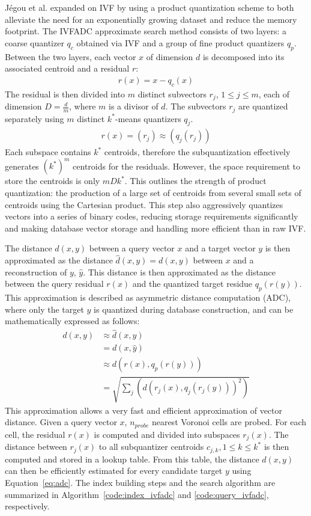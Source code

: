 \documentclass[twoside,a4paper]{master}
\begin{document}
Jégou et al. expanded on IVF by using a product quantization scheme to both alleviate the need for an exponentially growing dataset and reduce the memory footprint. The IVFADC approximate search method consists of two layers: a coarse quantizer \(q_c\) obtained via IVF and a group of fine product quantizers \(q_p\). Between the two layers, each vector \(x\) of dimension \(d\) is decomposed into its associated centroid and a residual \(r\):
\begin{align}
    r(x) = x - q_c(x)
\end{align}
The residual is then divided into \(m\) distinct subvectors \(r_j\), \(1 \leq j \leq m\), each of dimension \(D = \frac{d}{m}\), where \(m\) is a divisor of \(d\). The subvectors \(r_j\) are quantized separately using \(m\) distinct \(k^*\)-means quantizers \(q_j\).
\begin{align}
    r(x) = (r_j) \approx (q_j(r_j))
\end{align}
Each subspace contains \(k^*\) centroids, therefore the subquantization effectively generates \((k^*)^m\) centroids for the residuals. However, the space requirement to store the centroids is only \(mDk^*\). This outlines the strength of product quantization: the production of a large set of centroids from several small sets of centroids using the Cartesian product. This step also aggressively quantizes vectors into a series of binary codes, reducing storage requirements significantly and making database vector storage and handling more efficient than in raw IVF.

The distance \(d(x,y)\) between a query vector \(x\) and a target vector \(y\) is then approximated as the distance \(\hat{d}(x,y) = d(x,y)\) between \(x\) and a reconstruction of \(y\), \(\hat{y}\). This distance is then approximated as the distance between the query residual \(r(x)\) and the quantized target residue \(q_p(r(y))\). This approximation is described as asymmetric distance computation (ADC), where only the target \(y\) is quantized during database construction, and can be mathematically expressed as follows:
\begin{align}
    d(x,y) &\approx \hat{d}(x,y) \\
    &= d(x,\hat{y}) \\
    &\approx d(r(x),q_p(r(y))) \\
    &= \sqrt{\sum_j (d(r_j(x), q_j(r_j(y)))^2)}
\label{eq:adc}
\end{align}
This approximation allows a very fast and efficient approximation of vector distance. Given a query vector \(x\), \(n_{probe}\) nearest Voronoi cells are probed. For each cell, the residual \(r(x)\) is computed and divided into subspaces \(r_j(x)\). The distance between \(r_j(x)\) to all subquantizer centroids \(c_{j,k}, 1\leq k\leq k^*\) is then computed and stored in a lookup table. From this table, the distance \(d(x,y)\) can then be efficiently estimated for every candidate target \(y\) using Equation~\ref{eq:adc}. The index building steps and the search algorithm are summarized in Algorithm~\ref{code:index_ivfadc} and \ref{code:query_ivfadc}, respectively.
\end{document}
